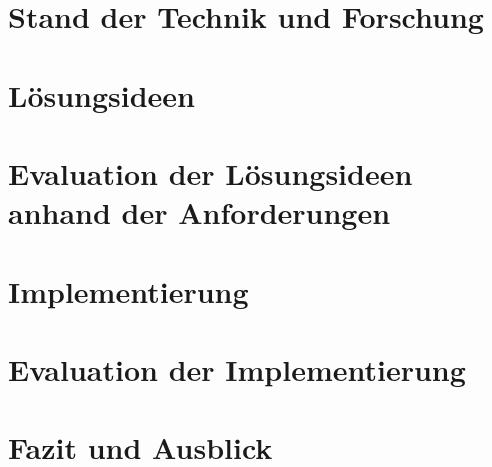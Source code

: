 \documentclass[11pt,twoside,a4paper,titlepage]{article}
\begin{document}
\section{Stand der Technik und Forschung}


\section{Lösungsideen}

\section{Evaluation der Lösungsideen anhand der Anforderungen} 

\section{Implementierung}

\section{Evaluation der Implementierung}

\section{Fazit und Ausblick}






%
%
{}
\end{document}

